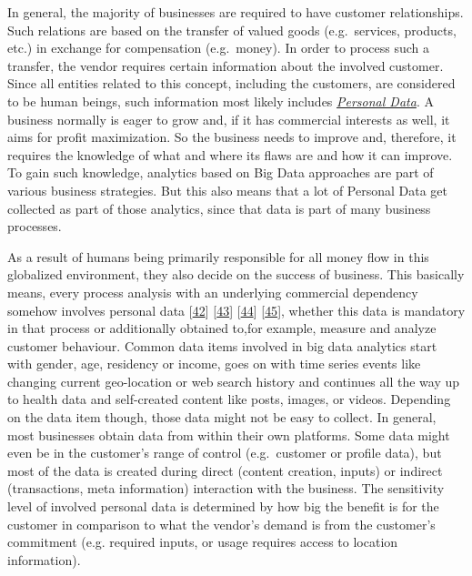 \documentclass[12pt,english,a4paper,titlepage,cleardoublepage=empty,dottedtoc]{report}
\begin{document}
In general, the majority of businesses are required to have customer
relationships. Such relations are based on the transfer of valued goods
(e.g.~services, products, etc.) in exchange for compensation
(e.g.~money). In order to process such a transfer, the vendor requires
certain information about the involved customer. Since all entities
related to this concept, including the customers, are considered to be
human beings, such information most likely includes
\emph{\protect\hyperlink{digital-identity-personal-data-and-ownership}{Personal
Data}}. A business normally is eager to grow and, if it has commercial
interests as well, it aims for profit maximization. So the business
needs to improve and, therefore, it requires the knowledge of what and
where its flaws are and how it can improve. To gain such knowledge,
analytics based on Big Data approaches are part of various business
strategies. But this also means that a lot of Personal Data get
collected as part of those analytics, since that data is part of many
business processes.

As a result of humans being primarily responsible for all money flow in
this globalized environment, they also decide on the success of
business. This basically means, every process analysis with an
underlying commercial dependency somehow involves personal data
{[}\protect\hyperlink{ref-web_2016_facebook-utilizes-98-data-points}{42}{]}
{[}\protect\hyperlink{ref-web_2016_big-data-types-of-data-used-in-analytics}{43}{]}
{[}\protect\hyperlink{ref-book-chapter_1999_Principles-of-knowledge-discovery-in-databases_introduction-to-data-mining}{44}{]}
{[}\protect\hyperlink{ref-web_2013_big-data-collection-collides-with-privacy-concerns}{45}{]},
whether this data is mandatory in that process or additionally obtained
to,for example, measure and analyze customer behaviour. Common data
items involved in big data analytics start with gender, age, residency
or income, goes on with time series events like changing current
geo-location or web search history and continues all the way up to
health data and self-created content like posts, images, or videos.
Depending on the data item though, those data might not be easy to
collect. In general, most businesses obtain data from within their own
platforms. Some data might even be in the customer's range of control
(e.g.~customer or profile data), but most of the data is created during
direct (content creation, inputs) or indirect (transactions, meta
information) interaction with the business. The sensitivity level of
involved personal data is determined by how big the benefit is for the
customer in comparison to what the vendor's demand is from the
customer's commitment (e.g. required inputs, or usage requires access to
location information).
\end{document}
